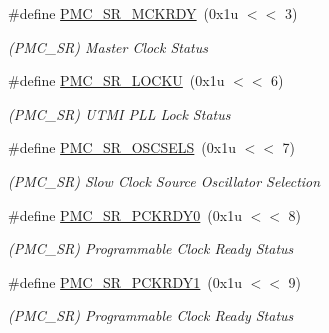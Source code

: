 \begin{DoxyCompactItemize}
\#define \mbox{\hyperlink{group__SAMV71__PMC_gae742c07d37e3011571a705ca768a5fee}{P\+M\+C\+\_\+\+S\+R\+\_\+\+M\+C\+K\+R\+DY}}~(0x1u $<$$<$ 3)
\begin{DoxyCompactList}\small\item\em (P\+M\+C\+\_\+\+SR) Master Clock Status \end{DoxyCompactList}\item 
\mbox{\label{group__SAMV71__PMC_gad6d4d9511d87b4e9375d3773c2bf6715}} 
\#define \mbox{\hyperlink{group__SAMV71__PMC_gad6d4d9511d87b4e9375d3773c2bf6715}{P\+M\+C\+\_\+\+S\+R\+\_\+\+L\+O\+C\+KU}}~(0x1u $<$$<$ 6)
\begin{DoxyCompactList}\small\item\em (P\+M\+C\+\_\+\+SR) U\+T\+MI P\+LL Lock Status \end{DoxyCompactList}\item 
\mbox{\label{group__SAMV71__PMC_ga3457d80fc8da68f5e954ab338f49fa22}} 
\#define \mbox{\hyperlink{group__SAMV71__PMC_ga3457d80fc8da68f5e954ab338f49fa22}{P\+M\+C\+\_\+\+S\+R\+\_\+\+O\+S\+C\+S\+E\+LS}}~(0x1u $<$$<$ 7)
\begin{DoxyCompactList}\small\item\em (P\+M\+C\+\_\+\+SR) Slow Clock Source Oscillator Selection \end{DoxyCompactList}\item 
\mbox{\label{group__SAMV71__PMC_ga93e796516593a50d41d0aed02d2f0a27}} 
\#define \mbox{\hyperlink{group__SAMV71__PMC_ga93e796516593a50d41d0aed02d2f0a27}{P\+M\+C\+\_\+\+S\+R\+\_\+\+P\+C\+K\+R\+D\+Y0}}~(0x1u $<$$<$ 8)
\begin{DoxyCompactList}\small\item\em (P\+M\+C\+\_\+\+SR) Programmable Clock Ready Status \end{DoxyCompactList}\item 
\mbox{\label{group__SAMV71__PMC_ga02a40065bfafdb6c76cb8618e00091c1}} 
\#define \mbox{\hyperlink{group__SAMV71__PMC_ga02a40065bfafdb6c76cb8618e00091c1}{P\+M\+C\+\_\+\+S\+R\+\_\+\+P\+C\+K\+R\+D\+Y1}}~(0x1u $<$$<$ 9)
\begin{DoxyCompactList}\small\item\em (P\+M\+C\+\_\+\+SR) Programmable Clock Ready Status \end{DoxyCompactList}\item 
$$
\end{DoxyCompactItemize}
